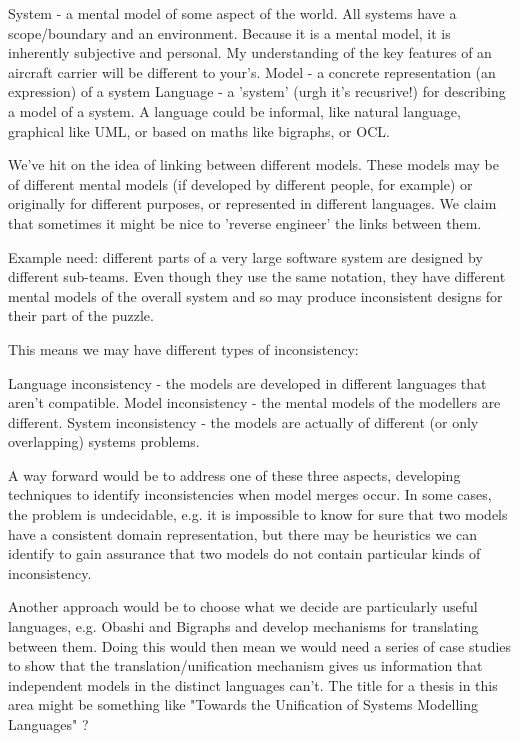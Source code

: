 System - a mental model of some aspect of the world.  All systems have a scope/boundary and an environment.  Because it is a mental model, it is inherently subjective and personal. My understanding of the key features of an aircraft carrier will be different to your's.
Model - a concrete representation (an expression) of a system
Language - a 'system' (urgh it's recusrive!) for describing a model of a system.  A language could be informal, like natural language, graphical like UML, or based on maths like bigraphs, or OCL.

We've hit on the idea of linking between different models.  These models may be of different mental models (if developed by different people, for example) or originally for different purposes, or represented in different languages.  We claim that sometimes it might be nice to 'reverse engineer' the links between them.

Example need: different parts of a very large software system are designed by different sub-teams.  Even though they use the same notation, they have different mental models of the overall system and so may produce inconsistent designs for their part of the puzzle.

This means we may have different types of inconsistency:


Language inconsistency - the models are developed in different languages that aren't compatible.
Model inconsistency - the mental models of the modellers are different.
System inconsistency - the models are actually of different (or only overlapping) systems problems.

A way forward would be to address one of these three aspects, developing techniques to identify inconsistencies when model merges occur.  In some cases, the problem is undecidable, e.g. it is impossible to know for sure that two models have a consistent domain representation, but there may be heuristics we can identify to gain assurance that two models do not contain particular kinds of inconsistency.

Another approach would be to choose what we decide are particularly useful languages, e.g. Obashi and Bigraphs and develop mechanisms for translating between them. Doing this would then mean we would need a series of case studies to show that the translation/unification mechanism gives us information that independent models in the distinct languages can't.  The title for a thesis in this area might be something like "Towards the Unification of Systems Modelling Languages" ?